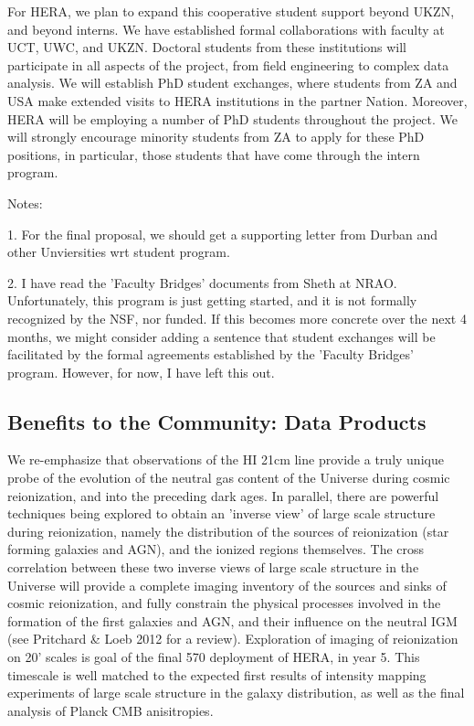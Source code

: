 \documentclass[preprint]{aastex}
\begin{document}
For HERA, we plan to expand this cooperative student support beyond
UKZN, and beyond interns. We have established formal collaborations
with faculty at UCT, UWC, and UKZN. Doctoral students from these
institutions will participate in all aspects of the project, from
field engineering to complex data analysis. We will establish PhD
student exchanges, where students from ZA and USA make extended visits
to HERA institutions in the partner Nation. Moreover, HERA will be
employing a number of PhD students throughout the project. We will
strongly encourage minority students from ZA to apply for these
PhD positions, in particular, those students that have come
through the intern program.

Notes:

1. For the final proposal, we should get a supporting letter from 
Durban and other Unviersities wrt student program. 

2. I have read the 'Faculty Bridges' documents from Sheth at NRAO.
Unfortunately, this program is just getting started, and it is not
formally recognized by the NSF, nor funded. If this becomes more
concrete over the next 4 months, we might consider adding a sentence
that student exchanges will be facilitated by the formal agreements
established by the 'Faculty Bridges' program.  However, for now, I
have left this out.

\subsection{Benefits to the Community: Data Products}

We re-emphasize that observations of the HI 21cm line provide a truly unique probe of the evolution of the neutral gas content of the Universe during cosmic reionization, and into the preceding dark ages. In parallel, there are powerful techniques being explored to obtain an 'inverse view' of large scale structure during reionization, namely the distribution of the sources of reionization (star forming galaxies and AGN), and the ionized regions themselves.  The cross correlation between these two inverse views of large scale structure in the Universe will provide a complete imaging inventory of the sources and sinks of cosmic reionization, and fully constrain the physical processes involved in the formation of the first galaxies and AGN, and their influence on the neutral IGM (see Pritchard \& Loeb 2012 for a review).  Exploration of imaging of reionization on 20' scales is goal of the final 570 deployment of HERA, in year 5. This timescale is well matched to the expected first results of intensity mapping experiments of large scale structure in the galaxy distribution, as well as the final analysis of Planck  CMB anisitropies. 
\end{document}
